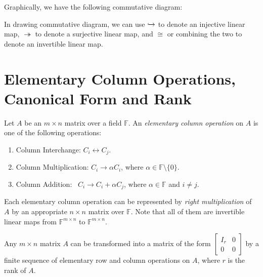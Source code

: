 \documentclass[
	11pt, %
	fleqn, %
	a4paper, %
]{LegrandOrangeBook}
\newcommand{\F}{\mathbb{F}} %
\begin{document}
Graphically, we have the following commutative diagram:
\begin{center}
\end{center}
\begin{remark}
    In drawing commutative diagram, we can use $\xhookrightarrow{}$ to denote an injective linear map, $\twoheadrightarrow$ to denote a surjective linear map, and $\cong$ or combining the two to denote an invertible linear map.
\end{remark}

\newpage

\section{Elementary Column Operations, Canonical Form and Rank}

\begin{definition}
    Let $A$ be an $m \times n$ matrix over a field $\F$. An \emph{elementary column operation} on $A$ is one of the following operations:
    \begin{enumerate}
        \item Column Interchange: \qquad $C_i \leftrightarrow C_j$.
        \item Column Multiplication: \quad $C_i \to \alpha C_i$, where $\alpha \in \F \setminus \{0\}$.
        \item Column Addition: \qquad\quad\ $C_i \to C_i + \alpha C_j$, where $\alpha \in \F$ and $i \neq j$.
    \end{enumerate}
    Each elementary column operation can be represented by \emph{right multiplication} of $A$ by an appropriate $n \times n$ matrix over $\F$. Note that all of them are invertible linear maps from $\F^{m \times n}$ to $\F^{m \times n}$.
\end{definition}

\begin{proposition}
    Any $m \times n$ matrix $A$ can be transformed into a matrix of the form $\begin{bmatrix}
        I_r & 0 \\
        0 & 0
    \end{bmatrix}$ by a finite sequence of elementary row and column operations on $A$, where $r$ is the rank of $A$.
\end{proposition}
\end{document}
